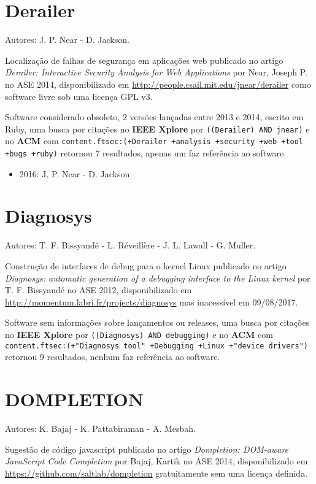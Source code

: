 \section{Derailer}

Autores:
J. P. Near - D. Jackson.

Localização de falhas de segurança em aplicações web
publicado no artigo {\it Derailer: Interactive Security Analysis for Web Applications}
por Near, Joseph P.
no ASE 2014,
disponibilizado em \url{http://people.csail.mit.edu/jnear/derailer}
como software livre
sob uma licença GPL v3.

Software considerado obsoleto,
2 versões lançadas
entre 2013 e 2014,
escrito em Ruby,
uma busca por citações no {\bf IEEE Xplore} por
\texttt{((Derailer) AND jnear)}
e no {\bf ACM} com
\texttt{content.ftsec:(+Derailer +analysis +security +web +tool +bugs +ruby)}
retornou
7 resultados,
apenas um faz referência ao software.

\begin{itemize}
\item 2016: J. P. Near - D. Jackson
\end{itemize}

\section{Diagnosys}

Autores:
T. F. Bissyandé - L. Réveillère - J. L. Lawall - G. Muller.

Construção de interfaces de debug para o kernel Linux
publicado no artigo {\it Diagnosys: automatic generation of a debugging interface to the Linux kernel}
por T. F. Bissyandé
no ASE 2012,
disponibilizado em \url{http://momentum.labri.fr/projects/diagnosys}
mas inacessível em 09/08/2017.

Software sem informações sobre lançamentos ou releases,
uma busca por citações no {\bf IEEE Xplore} por
\texttt{((Diagnosys) AND debugging)}
e no {\bf ACM} com
\texttt{content.ftsec:(+"Diagnosys tool" +Debugging +Linux +"device drivers")}
retornou
9 resultados,
nenhum faz referência ao software.


\section{DOMPLETION}

Autores:
K. Bajaj - K. Pattabiraman - A. Mesbah.

Sugestão de código javascript
publicado no artigo {\it Dompletion: DOM-aware JavaScript Code Completion}
por Bajaj, Kartik
no ASE 2014,
disponibilizado em \url{https://github.com/saltlab/dompletion}
gratuitamente
sem uma licença definida.

